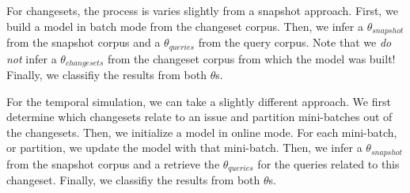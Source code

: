 For changesets, the process is varies slightly from a snapshot approach.
First, we build a model in batch mode from the changeset corpus.
Then, we infer a $\theta_{snapshot}$ from the snapshot corpus
and a $\theta_{queries}$ from the query corpus.
Note that we \emph{do not} infer a $\theta_{changesets}$ from the changeset corpus from which the model was built!
Finally, we classifiy the results from both $\theta$s.

\begin{comment}
\begin{enumerate}
    \item Build model from the changeset corpus in batch mode
    \item \emph{Do not} infer a $\theta_{changesets}$
    \item Infer a $\theta_{snapshot}$ from the snapshot corpus
    \item Infer a  $\theta_{queries}$ from the query corpus
    \item Classifiy, or rank, the results from both $\theta$s
\end{enumerate}
\end{comment}


For the temporal simulation, we can take a slightly different approach.
We first determine which changesets relate to an issue and partition mini-batches out of the changesets.
Then, we initialize a model in online mode.
For each mini-batch, or partition, we update the model with that mini-batch.
Then, we infer a $\theta_{snapshot}$ from the snapshot corpus
and a retrieve the $\theta_{queries}$ for the queries related to this changeset.
Finally, we classifiy the results from both $\theta$s.

\begin{comment}
\begin{enumerate}
    \item Initialize a model in online mode
    \item Determine which changesets relate to an issue and partition mini-batches out of the changesets
    \item For each mini-batch:
        \begin{enumerate}
            \item Update the model with mini-batch
            \item Update $\theta_{snapshot}$ with the new inference of the source code document affected by this changeset
            \item Infer a $\theta_{query}$ of the query related to the changeset we stopped at
            \item Classifiy, or rank, the results from both $\theta$s
        \end{enumerate}
\end{enumerate}
\end{comment}



